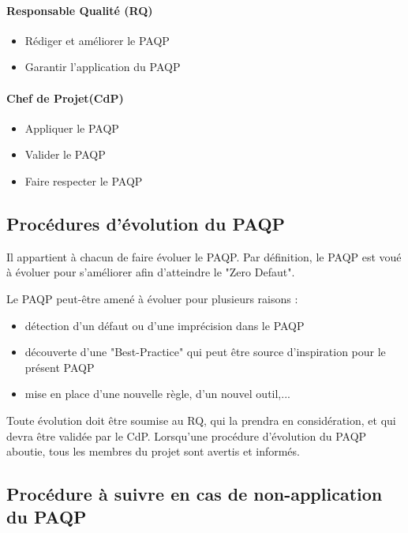 \paragraph{Responsable Qualité (RQ)\\}
                \begin{itemize}
                \item Rédiger et améliorer le PAQP
                \item Garantir l'application du PAQP
                \end{itemize}	
                
\paragraph{Chef de Projet(CdP)\\} 
                \begin{itemize}
                \item Appliquer le PAQP
                \item Valider le PAQP
                \item Faire respecter le PAQP
                \end{itemize}
    
  \subsection{Procédures d’évolution du PAQP}

Il appartient à chacun de faire évoluer le PAQP. Par définition, le PAQP est voué à évoluer pour s'améliorer afin d'atteindre le "Zero Defaut".
\par Le PAQP peut-être amené à évoluer pour plusieurs raisons : 
\begin{itemize}
\item détection d'un défaut ou d'une imprécision dans le PAQP 
\item découverte d'une "Best-Practice" qui peut être source d'inspiration pour le présent PAQP 
\item mise en place d'une nouvelle règle, d'un nouvel outil,...\\
\end{itemize}

Toute évolution doit être soumise au RQ, qui la prendra en considération, et qui devra être validée par le CdP. 
Lorsqu'une procédure d'évolution du PAQP aboutie, tous les membres du projet sont avertis et informés.

  \subsection{Procédure à suivre en cas de non-application du PAQP}

